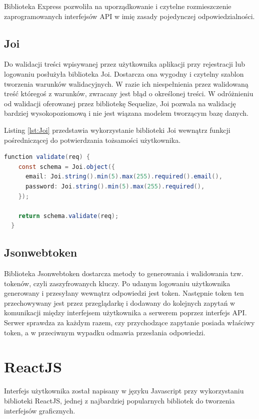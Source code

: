 \documentclass{sprz}
\begin{document}
Biblioteka Express pozwoliła na uporządkowanie i czytelne rozmieszczenie zaprogramowanych interfejsów API w imię zasady pojedynczej odpowiedzialności.

\subsection{Joi}

Do walidacji treści wpisywanej przez użytkownika aplikacji przy rejestracji lub logowaniu posłużyła biblioteka Joi. Dostarcza ona wygodny i czytelny szablon tworzenia warunków walidacyjnych. W razie ich niespełnienia przez walidowaną treść któregoś z warunków, zwracany jest błąd o określonej treści. W odróżnieniu od walidacji oferowanej przez bibliotekę Sequelize, Joi pozwala na walidację bardziej wysokopoziomową i nie jest wiązana modelem tworzącym bazę danych.

Listing \ref{lst:Joi} przedstawia wykorzystanie biblioteki Joi wewnątrz funkcji pośredniczącej do potwierdzania tożsamości użytkownika.

\begin{lstlisting}[language=Java,caption={Przykład wykorzystania Joi}, label={lst:Joi}]
  function validate(req) {
    const schema = Joi.object({
      email: Joi.string().min(5).max(255).required().email(),
      password: Joi.string().min(5).max(255).required(),
    });
  
    return schema.validate(req);
  }
\end{lstlisting}

\subsection{Jsonwebtoken}

Biblioteka Jsonwebtoken dostarcza metody to generowania i walidowania tzw. tokenów, czyli zaszyfrowanych kluczy. Po udanym logowaniu użytkownika generowany i przesyłany wewnątrz odpowiedzi jest token. Następnie token ten przechowywany jest przez przeglądarkę i dodawany do kolejnych zapytań w komunikacji między interfejsem użytkownika a serwerem poprzez interfejs API. Serwer sprawdza za każdym razem, czy przychodzące zapytanie posiada właściwy token, a w przeciwnym wypadku odmawia przesłania odpowiedzi.

\section{ReactJS}

Interfejs użytkownika został napisany w języku Javascript przy wykorzystaniu biblioteki ReactJS, jednej z najbardziej popularnych bibliotek do tworzenia interfejsów graficznych.
\end{document}
